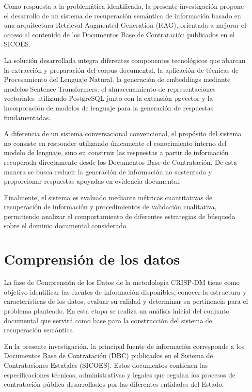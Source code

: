 Como respuesta a la problemática identificada, la presente investigación propone el desarrollo de un sistema de recuperación semántica de información basado en una arquitectura Retrieval-Augmented Generation (RAG), orientada a mejorar el acceso al contenido de los Documentos Base de Contratación publicados en el SICOES.

La solución desarrollada integra diferentes componentes tecnológicos que abarcan la extracción y preparación del corpus documental, la aplicación de técnicas de Procesamiento del Lenguaje Natural, la generación de embeddings mediante modelos Sentence Transformers, el almacenamiento de representaciones vectoriales utilizando PostgreSQL junto con la extensión pgvector y la incorporación de modelos de lenguaje para la generación de respuestas fundamentadas.

A diferencia de un sistema conversacional convencional, el propósito del sistema no consiste en responder utilizando únicamente el conocimiento interno del modelo de lenguaje, sino en construir las respuestas a partir de información recuperada directamente desde los Documentos Base de Contratación. De esta manera se busca reducir la generación de información no sustentada y proporcionar respuestas apoyadas en evidencia documental.

Finalmente, el sistema es evaluado mediante métricas cuantitativas de recuperación de información y procedimientos de validación cualitativa, permitiendo analizar el comportamiento de diferentes estrategias de búsqueda sobre el dominio documental considerado.

\section{Comprensión de los datos}

La fase de Comprensión de los Datos de la metodología CRISP-DM tiene como objetivo identificar las fuentes de información disponibles, conocer la estructura y características de los datos, evaluar su calidad y determinar su pertinencia para el problema planteado. En esta etapa se realiza un análisis inicial del conjunto documental que servirá como base para la construcción del sistema de recuperación semántica.

En la presente investigación, la principal fuente de información corresponde a los Documentos Base de Contratación (DBC) publicados en el Sistema de Contrataciones Estatales (SICOES). Estos documentos contienen las especificaciones técnicas, administrativas y legales que regulan los procesos de contratación pública desarrollados por las diferentes entidades del Estado.

